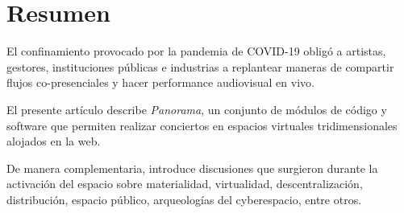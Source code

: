 \section*{Resumen}

El confinamiento provocado por la pandemia de COVID-19 obligó a artistas, gestores, instituciones públicas e industrias a replantear maneras de compartir flujos co-presenciales y hacer performance audiovisual en vivo.

El presente artículo describe \textit{Panorama}, un conjunto de módulos de código y software que permiten realizar conciertos en espacios virtuales tridimensionales alojados en la web.

De manera complementaria, introduce discusiones que surgieron durante la activación del espacio sobre materialidad, virtualidad, descentralización, distribución, espacio público, arqueologías del cyberespacio, entre otros.                       

